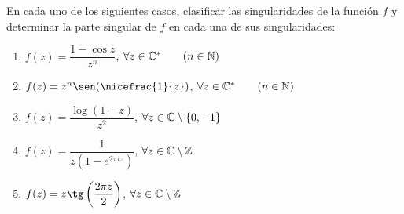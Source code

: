 
\begin{ejercicio}
    En cada uno de los siguientes casos, clasificar las singularidades de la función $f$ y determinar la parte singular de $f$ en cada una de sus singularidades:
    \begin{enumerate}
        \item $f(z) = \dfrac{1 - \cos z}{z^n}$, $\forall z \in \mathbb{C}^*\qquad (n \in \mathbb{N})$
        
        \item $f(z) = z^n \sen(\nicefrac{1}{z})$, $\forall z \in \mathbb{C}^*\qquad (n \in \mathbb{N})$
        \item $f(z) = \dfrac{\log(1 + z)}{z^2}$, $\forall z \in \mathbb{C} \setminus \{0, -1\}$
        \item $f(z) = \dfrac{1}{z(1 - e^{2\pi i z})}$, $\forall z \in \mathbb{C} \setminus \mathbb{Z}$
        \item $f(z) = z \tg\left(\dfrac{2\pi z}{2}\right)$, $\forall z \in \mathbb{C} \setminus \mathbb{Z}$
    \end{enumerate}
\end{ejercicio}

